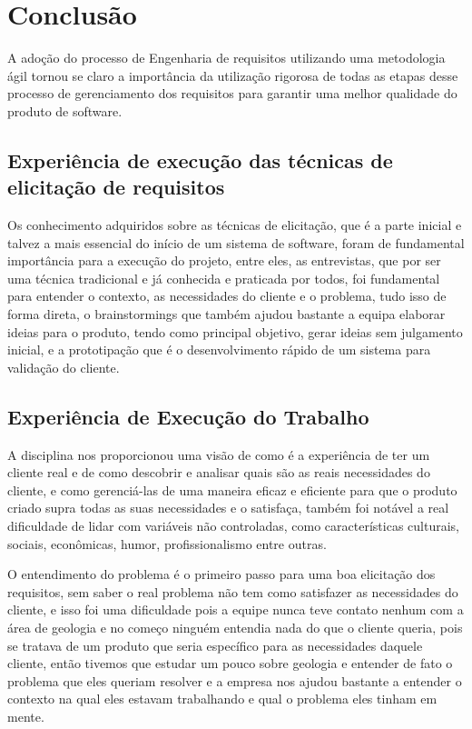\chapter{Conclusão}

  A adoção do processo de Engenharia de requisitos utilizando uma metodologia ágil tornou se claro a import\^{a}ncia da utilização rigorosa de
  todas as etapas desse processo de gerenciamento dos requisitos para garantir uma melhor qualidade do produto de software.

\section{Experiência de execução das técnicas de elicitação de requisitos}

  Os conhecimento adquiridos sobre as técnicas de elicitação, que é a parte inicial e talvez a mais essencial do início de um sistema de
  software, foram de fundamental import\^{a}ncia para a execução do projeto, entre eles, as entrevistas, que por ser uma técnica tradicional e
  já conhecida e praticada por todos, foi fundamental para entender o contexto, as necessidades do cliente e o problema, tudo isso de forma
  direta, o brainstormings que também ajudou bastante a equipa elaborar ideias para o produto, tendo como principal objetivo, gerar ideias sem
  julgamento inicial, e a prototipação que é o desenvolvimento rápido de um sistema para validação do cliente.

\section{Experiência de Execução do Trabalho}

  A disciplina nos proporcionou uma visão de como é a experiência de ter um cliente real e de como descobrir e analisar quais são as reais
  necessidades do cliente, e como gerenciá-las de uma maneira eficaz e eficiente para que o produto criado supra todas as suas necessidades e o
  satisfaça, também foi notável a real dificuldade de lidar com variáveis não controladas, como características culturais, sociais,
  econômicas, humor, profissionalismo entre outras.

  O entendimento do problema é o primeiro passo para uma boa elicitação dos requisitos, sem saber o real problema não tem como satisfazer as
  necessidades do cliente, e isso foi uma dificuldade pois a equipe nunca teve contato nenhum com a área de geologia e no começo ninguém
  entendia nada do que o cliente queria, pois se tratava de um produto que seria específico para as necessidades daquele cliente, então tivemos
  que estudar um pouco sobre geologia e entender de fato o problema que eles queriam resolver e a empresa nos ajudou bastante a entender o
  contexto na qual eles estavam trabalhando e qual o problema eles tinham em mente.

